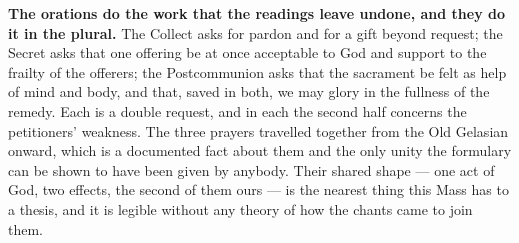 \textbf{The orations do the work that the readings leave undone, and they do it
in the plural.} The Collect asks for pardon and for a gift beyond request; the
Secret asks that one offering be at once acceptable to God and support to the
frailty of the offerers; the Postcommunion asks that the sacrament be felt as
help of mind and body, and that, saved in both, we may glory in the fullness of
the remedy. Each is a double request, and in each the second half concerns the
petitioners' weakness. The three prayers travelled together from the Old
Gelasian onward, which is a documented fact about them and the only unity the
formulary can be shown to have been given by anybody. Their shared shape ---
one act of God, two effects, the second of them ours --- is the nearest thing
this Mass has to a thesis, and it is legible without any theory of how the
chants came to join them.
